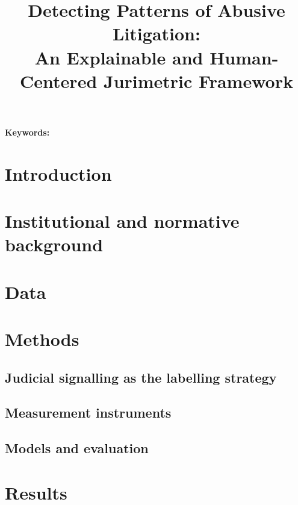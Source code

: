 \documentclass[11pt,a4paper]{article}
\title{Detecting Patterns of Abusive Litigation:\\
  An Explainable and Human-Centered Jurimetric Framework}
\author{%
}
\date{}
\begin{document}
\maketitle

\begin{abstract}
\end{abstract}

\noindent\textbf{Keywords:} %

\section{Introduction}

\section{Institutional and normative background}

\section{Data}
% 
% 

\section{Methods}
\subsection{Judicial signalling as the labelling strategy}

\subsection{Measurement instruments}

\subsection{Models and evaluation}

\section{Results}
% 
\end{document}
